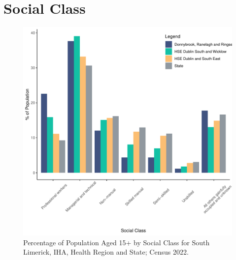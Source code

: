 \documentclass{article}
\begin{document}
\section{Social Class}\label{sect:SC}
\begin{figure}[H]
	\centering
	\includegraphics[width = 140mm]{../figures/SocialClassED.pdf}
	\caption{Percentage of Population Aged 15+ by Social Class for South Limerick, IHA, Health Region and State; Census 2022.}
	\label{fig:vbnv}
	\end{figure}
\end{document}
